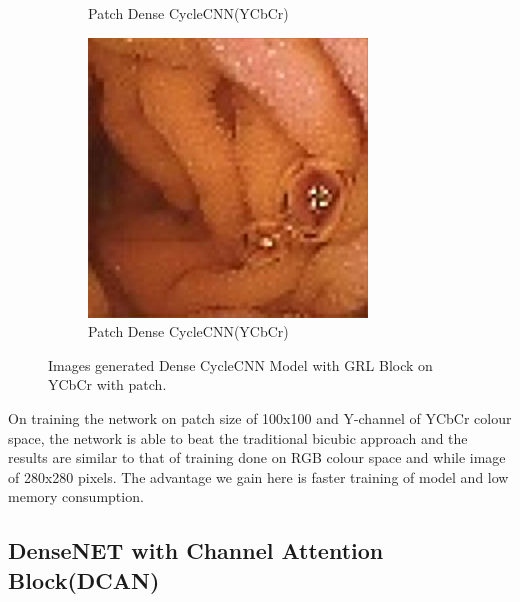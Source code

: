 \begin{figure}[H]
\begin{subfigure}[b]{0.32\textwidth}
    \caption{Patch Dense CycleCNN(YCbCr)}
  \end{subfigure}
  \begin{subfigure}[b]{0.32\textwidth}
    \includegraphics[width=\textwidth]{Chapter7/patch_ycbcr_dense_456.jpg}
    \caption{Patch Dense CycleCNN(YCbCr)}
  \end{subfigure}
    
    \caption[Images generated Dense CycleCNN Model with GRL Block on YCbCr with patch.]{Images generated Dense CycleCNN Model with GRL Block on YCbCr with patch.}
    \label{fig:label7.4}
\end{figure}
On training the network on patch size of 100x100 and Y-channel of YCbCr colour space, the network is able to beat the traditional bicubic approach and the results are similar to that of training done on RGB colour space and while image of 280x280 pixels. The advantage we gain here is faster training of model and low memory consumption.
\subsection{DenseNET with Channel Attention Block(DCAN)}


